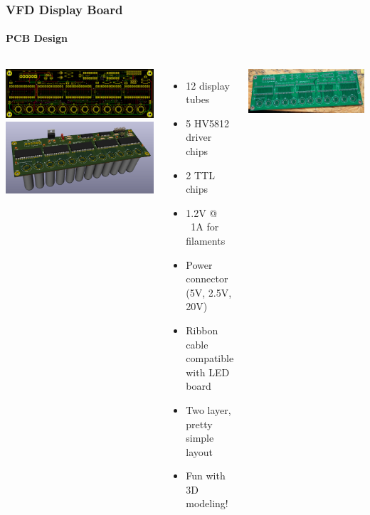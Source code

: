 \documentclass{beamer}
\begin{document}
\begin{frame}
  \frametitle{VFD Display Board}
  \framesubtitle{PCB Design}
  \vskip -0.2in
  \begin{columns}
    \includegraphics[width=\textwidth]{figs/vfd-layout.jpg} \\ 
    \vskip 0.4in
    \includegraphics[width=\textwidth]{figs/render_board.png} \\
    \begin{itemize}
    \scriptsize
    \item 12 display tubes
    \item 5 HV5812 driver chips
    \item 2 TTL chips
    \item 1.2V @ ~1A for filaments
    \item Power connector (5V, 2.5V, 20V)
    \item Ribbon cable compatible with LED board
    \item Two layer, pretty simple layout
    \item Fun with 3D modeling!
    \end{itemize}
    \vskip 0.1in

    \includegraphics[width=\textwidth]{figs/vfd-board-bare.jpg}

  \end{columns}
\end{frame}
\end{document}
